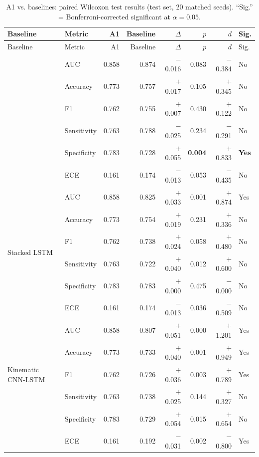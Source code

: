 \documentclass[12pt,a4paper]{article}
\begin{document}
\begin{longtable}{@{}l l r r r r r l@{}}
\caption{A1 vs. baselines: paired Wilcoxon test results (test set, 20 matched seeds).
``Sig.'' = Bonferroni-corrected significant at $\alpha=0.05$.}
\label{tab:s4_stats} \\
\toprule
Baseline & Metric & A1 & Baseline & $\Delta$ & $p$ & $d$ & Sig. \\
\midrule
\endfirsthead
\toprule
Baseline & Metric & A1 & Baseline & $\Delta$ & $p$ & $d$ & Sig. \\
\midrule
\endhead
\bottomrule
\endfoot
\multirow{5}{*}{MTC-Former}
 & AUC         & 0.858 & 0.874 & $-$0.016 & 0.083 & $-$0.384 & No \\
 & Accuracy    & 0.773 & 0.757 & $+$0.017 & 0.105 & $+$0.345 & No \\
 & F1          & 0.762 & 0.755 & $+$0.007 & 0.430 & $+$0.122 & No \\
 & Sensitivity & 0.763 & 0.788 & $-$0.025 & 0.234 & $-$0.291 & No \\
 & Specificity & 0.783 & 0.728 & $+$0.055 & \textbf{0.004} & $+$0.833 & \textbf{Yes} \\
 & ECE         & 0.161 & 0.174 & $-$0.013 & 0.053 & $-$0.435 & No \\
\midrule
\multirow{6}{*}{Stacked LSTM}
 & AUC         & 0.858 & 0.825 & $+$0.033 & 0.001 & $+$0.874 & Yes \\
 & Accuracy    & 0.773 & 0.754 & $+$0.019 & 0.231 & $+$0.336 & No \\
 & F1          & 0.762 & 0.738 & $+$0.024 & 0.058 & $+$0.480 & No \\
 & Sensitivity & 0.763 & 0.722 & $+$0.040 & 0.012 & $+$0.600 & No \\
 & Specificity & 0.783 & 0.783 & $+$0.000 & 0.475 & $-$0.000 & No \\
 & ECE         & 0.161 & 0.174 & $-$0.013 & 0.036 & $-$0.509 & No \\
\midrule
\multirow{5}{*}{Kinematic CNN-LSTM}
 & AUC         & 0.858 & 0.807 & $+$0.051 & 0.000 & $+$1.201 & Yes \\
 & Accuracy    & 0.773 & 0.733 & $+$0.040 & 0.001 & $+$0.949 & Yes \\
 & F1          & 0.762 & 0.726 & $+$0.036 & 0.003 & $+$0.789 & Yes \\
 & Sensitivity & 0.763 & 0.738 & $+$0.025 & 0.144 & $+$0.327 & No \\
 & Specificity & 0.783 & 0.729 & $+$0.054 & 0.015 & $+$0.654 & No \\
 & ECE         & 0.161 & 0.192 & $-$0.031 & 0.002 & $-$0.800 & Yes \\

\end{longtable}
\end{document}

